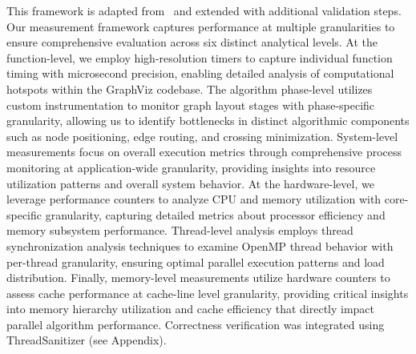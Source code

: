 This framework is adapted from~\cite{dongarra2011international} and extended with additional validation steps. Our measurement framework captures performance at multiple granularities to ensure comprehensive evaluation across six distinct analytical levels. At the function-level, we employ high-resolution timers to capture individual function timing with microsecond precision, enabling detailed analysis of computational hotspots within the GraphViz codebase. The algorithm phase-level utilizes custom instrumentation to monitor graph layout stages with phase-specific granularity, allowing us to identify bottlenecks in distinct algorithmic components such as node positioning, edge routing, and crossing minimization. System-level measurements focus on overall execution metrics through comprehensive process monitoring at application-wide granularity, providing insights into resource utilization patterns and overall system behavior. At the hardware-level, we leverage performance counters to analyze CPU and memory utilization with core-specific granularity, capturing detailed metrics about processor efficiency and memory subsystem performance. Thread-level analysis employs thread synchronization analysis techniques to examine OpenMP thread behavior with per-thread granularity, ensuring optimal parallel execution patterns and load distribution. Finally, memory-level measurements utilize hardware counters to assess cache performance at cache-line level granularity, providing critical insights into memory hierarchy utilization and cache efficiency that directly impact parallel algorithm performance. Correctness verification was integrated using ThreadSanitizer (see Appendix).

